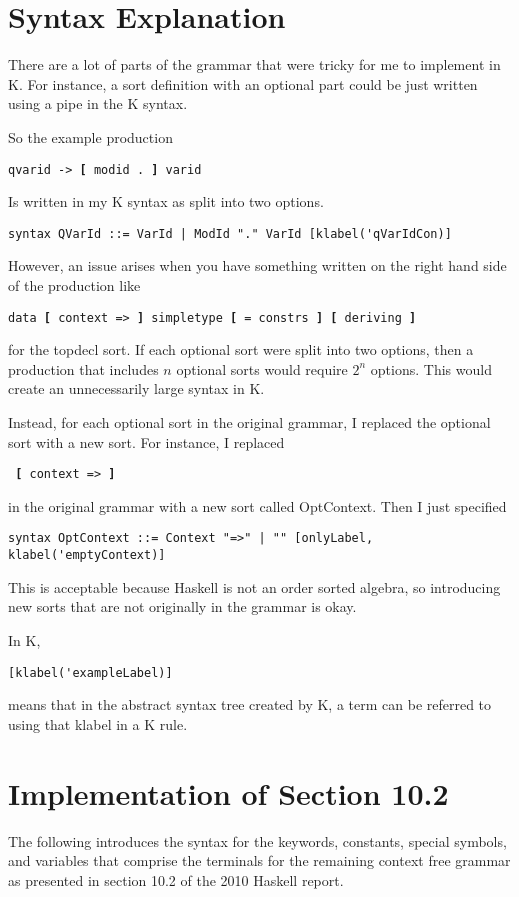 \section{Syntax Explanation}
There are a lot of parts of the grammar that were tricky for me to implement in K. For instance, a sort definition with an optional part could be just written using a pipe
in the K syntax.

So the example production

\texttt{qvarid -> \textbf{[} modid . \textbf{]} varid}

Is written in my K syntax as split into two options.
\begin{lstlisting}
syntax QVarId ::= VarId | ModId "." VarId [klabel('qVarIdCon)]
\end{lstlisting}
However, an issue arises when you have something written on the right hand side of the production like

\texttt{data \textbf{[} context => \textbf{]} simpletype \textbf{[} = constrs \textbf{]} \textbf{[} deriving \textbf{]}}

for the topdecl sort. If each optional sort were split into two options, then a production that includes $n$ optional sorts would require $2^n$ options. This would create an unnecessarily large syntax in K.

Instead, for each optional sort in the original grammar, I replaced the optional sort with a new sort. For instance, I replaced

\texttt{ \textbf{[} context => \textbf{]} }

in the original grammar with a new sort called OptContext. Then I just specified
\begin{lstlisting}
syntax OptContext ::= Context "=>" | "" [onlyLabel, klabel('emptyContext)]
\end{lstlisting}
This is acceptable because Haskell is not an order sorted algebra, so introducing new sorts that are not originally in the grammar is okay.

In K,
\begin{lstlisting}
[klabel('exampleLabel)]
\end{lstlisting}
means that in the abstract syntax tree created by K, a term can be referred to using that klabel in a K rule.

\section{Implementation of Section 10.2}
The following introduces the syntax for the keywords, constants, special symbols, and variables that comprise the terminals for the remaining context free grammar as presented in section 10.2 of the 2010 Haskell report.

